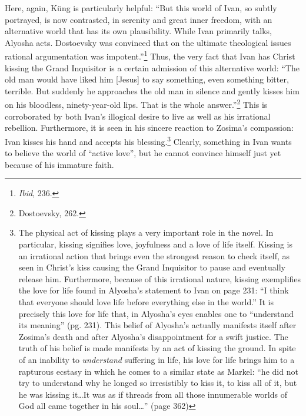 Here, again, K\"{u}ng is particularly helpful: ``But this world of Ivan, so subtly portrayed, is now contrasted, in serenity and great inner freedom, with an alternative world that has its own plausibility. While Ivan primarily talks, Alyosha acts. Dostoevsky was convinced that on the ultimate theological issues rational argumentation was impotent.''\footnote{\emph{Ibid}, 236.} Thus, the very fact that Ivan has Christ kissing the Grand Inquisitor is a certain admission of this alternative world: ``The old man would have liked him [Jesus] to say something, even something bitter, terrible. But suddenly he approaches the old man in silence and gently kisses him on his bloodless, ninety-year-old lips. That is the whole answer.''\footnote{Dostoevsky, 262.} This is corroborated by both Ivan's illogical desire to live as well as his irrational rebellion. Furthermore, it is seen in his sincere reaction to Zosima's compassion: Ivan kisses his hand and accepts his blessing.\footnote{The physical act of kissing plays a very important role in the novel. In particular, kissing signifies love, joyfulness and a love of life itself. Kissing is an irrational action that brings even the strongest reason to check itself, as seen in Christ's kiss causing the Grand Inquisitor to pause and eventually release him. Furthermore, because of this irrational nature, kissing exemplifies the love for life found in Alyosha's statement to Ivan on page 231: ``I think that everyone should love life before everything else in the world.'' It is precisely this love for life that, in Alyosha's eyes enables one to ``understand its meaning'' (pg. 231). This belief of Alyosha's actually manifests itself after Zosima's death and after Alyosha's disappointment for a swift justice. The truth of his belief is made manifests by an act of kissing the ground. In spite of an inability to \emph{understand} suffering in life, his love for life brings him to a rapturous ecstasy in which he comes to a similar state as Markel: ``he did not try to understand why he longed so irresistibly to kiss it, to kiss all of it, but he was kissing it\ldots It was as if threads from all those innumerable worlds of God all came together in his soul\ldots'' (page 362)} Clearly, something in Ivan wants to believe the world of ``active love'', but he cannot convince himself just yet because of his immature faith.

